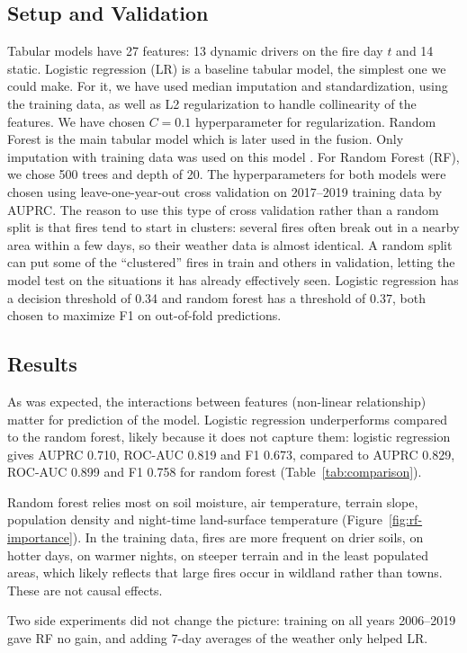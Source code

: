 \subsection{Setup and Validation}
Tabular models have 27 features: 13 dynamic drivers on the fire day $t$ and 14 static. Logistic regression (LR) is a baseline tabular model, the simplest one we could make. For it, we have used median imputation and standardization, using the training data, as well as L2 regularization to handle collinearity of the features. We have chosen $C=0.1$ hyperparameter for regularization. Random Forest is the main tabular model which is later used in the fusion. Only imputation with training data was used on this model \cite{pedregosa2011sklearn}. For Random Forest (RF), we chose 500 trees and depth of 20. The hyperparameters for both models were chosen using leave-one-year-out cross validation on 2017--2019 training data by AUPRC. The reason to use this type of cross validation rather than a random split is that fires tend to start in clusters: several fires often break out in a nearby area within a few days, so their weather data is almost identical. A random split can put some of the ``clustered'' fires in train and others in validation, letting the model test on the situations it has already effectively seen. Logistic regression has a decision threshold of 0.34 and random forest has a threshold of 0.37, both chosen to maximize F1 on out-of-fold predictions.

\subsection{Results}
As was expected, the interactions between features (non-linear relationship) matter for prediction of the model. Logistic regression underperforms compared to the random forest, likely because it does not capture them: logistic regression gives AUPRC 0.710, ROC-AUC 0.819 and F1 0.673, compared to AUPRC 0.829, ROC-AUC 0.899 and F1 0.758 for random forest (Table~\ref{tab:comparison}).

Random forest relies most on soil moisture, air temperature, terrain slope, population density and night-time land-surface temperature (Figure~\ref{fig:rf-importance}). In the training data, fires are more frequent on drier soils, on hotter days, on warmer nights, on steeper terrain and in the least populated areas, which likely reflects that large fires occur in wildland rather than towns. These are not causal effects.

Two side experiments did not change the picture: training on all years 2006--2019 gave RF no gain, and adding 7-day averages of the weather only helped LR.

